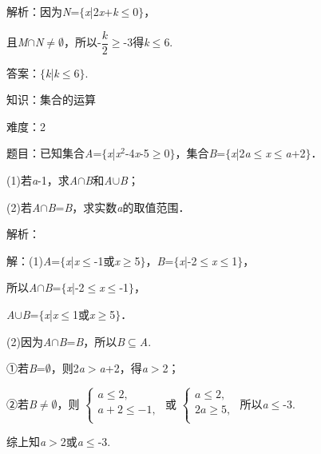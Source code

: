 \documentclass{article} %
\begin{document}
解析：因为\textit{N}=$\mathrm{\{}$\textit{x}|2\textit{x}+\textit{k}$\mathrm{\le}$0$\mathrm{\}}$，

且\textit{M}$\mathrm{\cap}$\textit{N}$\mathrm{\neq}$$\mathrm{\emptyset}$，所以-$\dfrac{k}{2}$$\mathrm{\ge}$-3得\textit{k}$\mathrm{\le}$6.

答案：$\mathrm{\{}$\textit{k}|\textit{k}$\mathrm{\le}$6$\mathrm{\}}$.

知识：集合的运算

难度：2

题目：已知集合\textit{A}=$\mathrm{\{}$\textit{x}|\textit{x}${}^{2}$-4\textit{x}-5$\mathrm{\ge}$0$\mathrm{\}}$，集合\textit{B}=$\mathrm{\{}$\textit{x}|2\textit{a}$\mathrm{\le}$\textit{x}$\mathrm{\le}$\textit{a}+2$\mathrm{\}}$．

(1)若\textit{a}-1，求\textit{A}$\mathrm{\cap}$\textit{B}和\textit{A}$\mathrm{\cup}$\textit{B}；

(2)若\textit{A}$\mathrm{\cap}$\textit{B}=\textit{B}，求实数\textit{a}的取值范围．

解析：

解：(1)\textit{A}=$\mathrm{\{}$\textit{x}|\textit{x}$\mathrm{\le}$-1或\textit{x}$\mathrm{\ge}$5$\mathrm{\}}$，\textit{B}=$\mathrm{\{}$\textit{x}|-2$\mathrm{\le}$\textit{x}$\mathrm{\le}$1$\mathrm{\}}$，

所以\textit{A}$\mathrm{\cap}$\textit{B}=$\mathrm{\{}$\textit{x}|-2$\mathrm{\le}$\textit{x}$\mathrm{\le}$-1$\mathrm{\}}$，

\textit{A}$\mathrm{\cup}$\textit{B}=$\mathrm{\{}$\textit{x}|\textit{x}$\mathrm{\le}$1或\textit{x}$\mathrm{\ge}$5$\mathrm{\}}$．

(2)因为\textit{A}$\mathrm{\cap}$\textit{B}=\textit{B}，所以\textit{B}$\mathrm{\subseteq }$\textit{A}.

①若\textit{B}=$\mathrm{\emptyset}$，则2\textit{a}$\mathrm{>}$\textit{a}+2，得\textit{a}$\mathrm{>}$2；

②若\textit{B}$\mathrm{\neq}$$\mathrm{\emptyset}$，则
$\left\{
\begin{array}{l}
a\le2,\\
a+2\le-1,\\
\end{array}
\right.$
或
$\left\{
\begin{array}{l}
a\le2,\\
2a\ge5,\\
\end{array}
\right.$
所以\textit{a}$\mathrm{\le}$-3.

综上知\textit{a}$\mathrm{>}$2或\textit{a}$\mathrm{\le}$-3.
\end{document}
